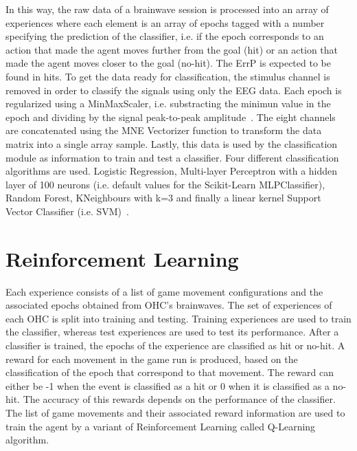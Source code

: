 \documentclass[journal]{IEEEtran}
\begin{document}
{In this way, the raw data of a brainwave session is processed into an array of experiences where each element is an array of epochs tagged with a number specifying the prediction of the classifier, i.e. if the epoch corresponds to an action that made the agent moves further from the goal (hit) or an action that made the agent moves closer to the goal (no-hit). The ErrP is expected to be found in hits. To get the data ready for classification, the stimulus channel is removed in order to classify the signals using only the EEG data. Each epoch is regularized using a MinMaxScaler, i.e. substracting the minimun value in the epoch and dividing by the signal peak-to-peak amplitude~\cite{Zhou2019}.  The eight channels are concatenated using the  MNE Vectorizer function to transform the data matrix into a single array sample. Lastly, this data is used by the classification module as information to train and test a classifier. Four different classification algorithms are used.  Logistic Regression, Multi-layer Perceptron with a hidden layer of 100 neurons (i.e. default values for the Scikit-Learn MLPClassifier), Random Forest, KNeighbours with k=3 and finally a linear kernel Support Vector Classifier (i.e. SVM)~\cite{Lotte2018}.  




\section{Reinforcement Learning}
\label{learning}

Each experience consists of a list of game movement configurations and the associated epochs obtained from OHC's brainwaves.  The set of experiences of each OHC is split into training and testing.  Training experiences are used to train the classifier, whereas test experiences are used to test its performance.  After a classifier is trained, the epochs of the experience are classified as hit or no-hit.  A reward for each movement in the game run is produced, based on the classification of the epoch that correspond to that movement.  The reward can either be -1 when the event is classified as a hit or 0 when it is classified as a no-hit. The accuracy of this rewards depends on the performance of the classifier. The list of game movements and their associated reward information are used to train the agent by a variant of Reinforcement Learning called Q-Learning algorithm.

}
\end{document}
